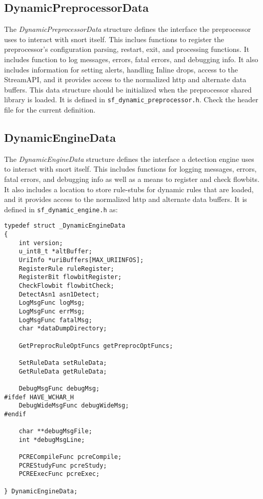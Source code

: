 \documentclass[english]{report}
\begin{document}
\subsection{DynamicPreprocessorData}

The {\em DynamicPreprocessorData} structure defines the interface the
preprocessor uses to interact with snort itself.  This inclues functions to
register the preprocessor's configuration parsing, restart, exit, and
processing functions.  It includes function to log messages, errors, fatal
errors, and debugging info.  It also includes information for setting alerts,
handling Inline drops, access to the StreamAPI, and it provides access to the
normalized http and alternate data buffers.  This data structure should be
initialized when the preprocessor shared library is loaded.  It is defined in
\texttt{sf\_dynamic\_preprocessor.h}.  Check the header file for the current
definition.

\subsection{DynamicEngineData}

The {\em DynamicEngineData} structure defines the interface a detection engine
uses to interact with snort itself.  This includes functions for logging
messages, errors, fatal errors, and debugging info as well as a means to
register and check flowbits.  It also includes a location to store rule-stubs
for dynamic rules that are loaded, and it provides access to the normalized
http and alternate data buffers.  It is defined in
\texttt{sf\_dynamic\_engine.h} as:

\begin{verbatim}
typedef struct _DynamicEngineData
{
    int version;
    u_int8_t *altBuffer;
    UriInfo *uriBuffers[MAX_URIINFOS];
    RegisterRule ruleRegister;
    RegisterBit flowbitRegister;
    CheckFlowbit flowbitCheck;
    DetectAsn1 asn1Detect;
    LogMsgFunc logMsg;
    LogMsgFunc errMsg;
    LogMsgFunc fatalMsg;
    char *dataDumpDirectory;

    GetPreprocRuleOptFuncs getPreprocOptFuncs;

    SetRuleData setRuleData;
    GetRuleData getRuleData;

    DebugMsgFunc debugMsg;
#ifdef HAVE_WCHAR_H
    DebugWideMsgFunc debugWideMsg;
#endif

    char **debugMsgFile;
    int *debugMsgLine;

    PCRECompileFunc pcreCompile;
    PCREStudyFunc pcreStudy;
    PCREExecFunc pcreExec;

} DynamicEngineData;
\end{verbatim}
\end{document}
